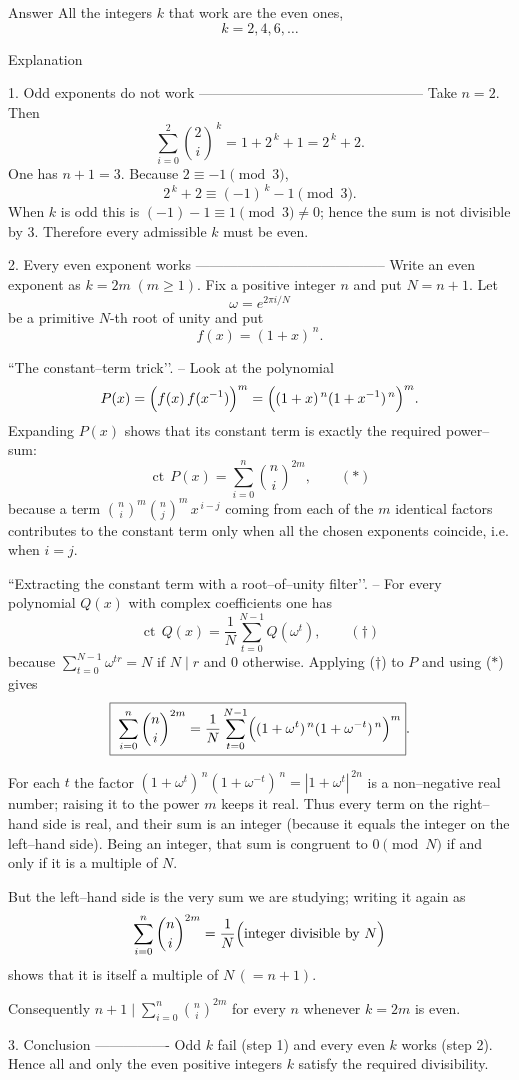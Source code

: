 Answer  
All the integers \(k\) that work are the even ones,
\[ k=2,4,6,\dots \]

Explanation  

1.  Odd exponents do ​not​ work  
   ------------------------------------------------  
   Take \(n=2\).  Then  
   \[
       \sum_{i=0}^{2}\binom 2i^{\,k}=1+2^{\,k}+1=2^{\,k}+2 .
   \]
   One has \(n+1=3\).  
   Because \(2\equiv-1\pmod 3\),  
   \[
        2^{\,k}+2\equiv(-1)^{\,k}-1\pmod 3 .
   \]
   When \(k\) is odd this is
   \((-1)-1\equiv1\pmod3\neq0\);
   hence the sum is not divisible by \(3\).
   Therefore every admissible \(k\) must be even.

2.  Every even exponent works  
   -----------------------------------------  
   Write an even exponent as \(k=2m\;(m\ge1)\).
   Fix a positive integer \(n\) and put \(N=n+1\).
   Let  
   \[
        \omega=e^{2\pi i/N}
   \]
   be a primitive \(N\)-th root of unity and put
   \[
        f(x)=(1+x)^{\,n}.
   \]

   ``The constant–term trick’’. –  
   Look at the polynomial
   \[
        P(x)=\Bigl(f(x)\,f(x^{-1})\Bigr)^{m}
             =\Bigl((1+x)^{\,n}(1+x^{-1})^{\,n}\Bigr)^{m}.
   \]
   Expanding \(P(x)\) shows that its constant term is exactly the
   required power–sum:
   \[
        \operatorname{ct}\, P(x)=\sum_{i=0}^{n}\binom ni^{2m},
        \qquad (\ast)
   \]
   because a term
   \(\binom ni^{m}\binom nj^{m}\,x^{\,i-j}\)
   coming from each of the
   \(m\) identical factors contributes to the constant term
   only when all the chosen exponents coincide, i.e. when \(i=j\).

   ``Extracting the constant term with a root–of–unity filter’’. –  
   For every polynomial \(Q(x)\) with complex coefficients one has
   \[
        \operatorname{ct}\,Q(x)=\frac1N
             \sum_{t=0}^{N-1}Q(\omega^{t}),
        \qquad(\dagger)
   \]
   because \(\sum_{t=0}^{N-1}\omega^{tr}=N\) if \(N\mid r\) and \(0\)
   otherwise.  Applying (\(\dagger\)) to \(P\) and using (\(\ast\)) gives
   \[
        \boxed{\;
        \sum_{i=0}^{n}\binom ni^{2m}
        =\frac1N\sum_{t=0}^{N-1}
                \Bigl((1+\omega^{t})^{\,n}(1+\omega^{-t})^{\,n}\Bigr)^{m}
        } .
   \]

   For each \(t\) the factor
   \( (1+\omega^{t})^{\,n}(1+\omega^{-t})^{\,n}=
      |1+\omega^{t}|^{\,2n}\)
   is a non–negative real number;
   raising it to the power \(m\) keeps it real.
   Thus every term on the right–hand side is real,
   and their sum is an integer (because it equals the integer on
   the left–hand side).  Being an integer, that sum is congruent to
   \(0\pmod N\) if and only if it is a multiple of \(N\).

   But the left–hand side is the very sum we are studying; writing
   it again as
   \[
        \sum_{i=0}^{n}\binom ni^{2m}
        =\frac1{N}\Bigl(\text{integer divisible by }N\Bigr)
   \]
   shows that it is ​itself​ a multiple of \(N\,(=n+1)\).

   Consequently \(n+1\;\bigl|\;\sum_{i=0}^{n}\binom ni^{2m}\) for every
   \(n\) whenever \(k=2m\) is even.

3.  Conclusion  
   ----------------  
   Odd \(k\) fail (step 1) and every even \(k\) works (step 2).  Hence
   all and only the even positive integers \(k\) satisfy the required
   divisibility.